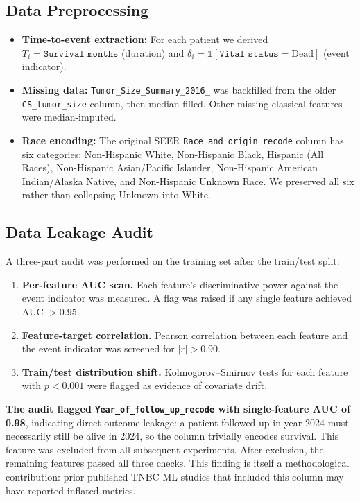 \documentclass[12pt, letterpaper]{article}
\begin{document}
\subsection{Data Preprocessing}
\begin{itemize}
    \item \textbf{Time-to-event extraction:} For each patient we derived $T_i = \texttt{Survival\_months}$ (duration) and $\delta_i = \mathbb{1}[\texttt{Vital\_status} = \text{Dead}]$ (event indicator).
    \item \textbf{Missing data:} \texttt{Tumor\_Size\_Summary\_2016\_} was backfilled from the older \texttt{CS\_tumor\_size} column, then median-filled. Other missing classical features were median-imputed.
    \item \textbf{Race encoding:} The original SEER \texttt{Race\_and\_origin\_recode} column has six categories: Non-Hispanic White, Non-Hispanic Black, Hispanic (All Races), Non-Hispanic Asian/Pacific Islander, Non-Hispanic American Indian/Alaska Native, and Non-Hispanic Unknown Race. We preserved all six rather than collapsing Unknown into White.
\end{itemize}

\subsection{Data Leakage Audit}
A three-part audit was performed on the training set after the train/test split:

\begin{enumerate}
    \item \textbf{Per-feature AUC scan.} Each feature's discriminative power against the event indicator was measured. A flag was raised if any single feature achieved AUC $> 0.95$.
    \item \textbf{Feature-target correlation.} Pearson correlation between each feature and the event indicator was screened for $|r| > 0.90$.
    \item \textbf{Train/test distribution shift.} Kolmogorov--Smirnov tests for each feature with $p < 0.001$ were flagged as evidence of covariate drift.
\end{enumerate}

\textbf{The audit flagged \texttt{Year\_of\_follow\_up\_recode} with single-feature AUC of 0.98}, indicating direct outcome leakage: a patient followed up in year 2024 must necessarily still be alive in 2024, so the column trivially encodes survival. This feature was excluded from all subsequent experiments. After exclusion, the remaining features passed all three checks. This finding is itself a methodological contribution: prior published TNBC ML studies that included this column may have reported inflated metrics.
\end{document}
